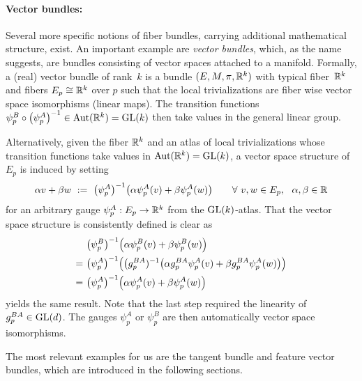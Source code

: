 \paragraph{Vector bundles:}
Several more specific notions of fiber bundles, carrying additional mathematical structure, exist.
An important example are \emph{vector bundles}, which, as the name suggests, are bundles consisting of vector spaces attached to a manifold.
Formally, a (real) vector bundle of rank~$k$ is a bundle $(E,M,\pi,\mathbb{R}^k)$ with typical fiber~$\mathbb{R}^k$ and fibers $E_p \cong \mathbb{R}^k$ over $p$ such that the local trivializations are fiber wise vector space isomorphisms (linear maps).
The transition functions $\psi^B_p \circ \big(\psi^A_p\big)^{-1} \in \operatorname{Aut}(\mathbb{R}^k) = \operatorname{GL}(k)$ then take values in the general linear group.

Alternatively, given the fiber $\mathbb{R}^k$ and an atlas of local trivializations whose transition functions take values in $\operatorname{Aut}(\mathbb{R}^k) = \operatorname{GL}(k)$, a vector space structure of $E_p$ is induced by setting
\begin{align}
    \alpha v + \beta w \ :=\ \big(\psi_p^A \big)^{-1} \big( \alpha \psi_p^A(v) + \beta \psi_p^A(w) \big) \qquad \forall\ v,w\in E_p,\ \ \alpha,\beta\in\R
\end{align}
for an arbitrary gauge $\psi_p^A: E_p \to \mathbb{R}^k$ from the $\operatorname{GL}(k)$-atlas.
That the vector space structure is consistently defined is clear as
\begin{align}
       &\big( \psi_p^B \big)^{-1} \pig( \alpha \psi_p^B(v) + \beta \psi_p^B(w) \pig) \notag \\
    =\ &\big( \psi_p^A \big)^{-1} \pig( \big(g^{BA}_p)^{-1} \big( \alpha g^{BA}_p \psi_p^A(v) + \beta g^{BA}_p \psi_p^A(w) \big) \pig) \notag \\
    =\ &\big( \psi_p^A \big)^{-1} \pig( \alpha \psi_p^A(v) + \beta \psi_p^A(w) \pig)
\end{align}
yields the same result.
Note that the last step required the linearity of $g_p^{BA} \in \operatorname{GL}(d)$.
The gauges $\psi_p^A$ or $\psi_p^B$ are then automatically vector space isomorphisms.

The most relevant examples for us are the tangent bundle and feature vector bundles, which are introduced in the following sections.










